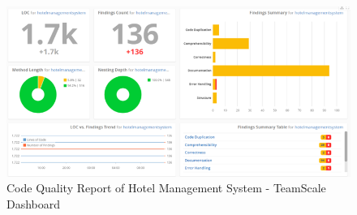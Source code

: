 \documentclass[letterpaper, 11pt]{report}
\begin{document}
\\
\begin{figure}[htb]
\begin{center}
\includegraphics[width=12cm]{D1-Reengineering Opportunity/images/Picture3.png}
\caption{Code Quality Report of Hotel Management System - TeamScale Dashboard}
\end{center}
\end{figure}
\pagebreak
{}
\end{document}
